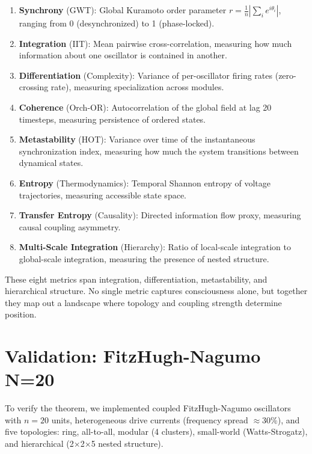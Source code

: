 \begin{enumerate}
  \item \textbf{Synchrony} (GWT): Global Kuramoto order parameter $r = \frac{1}{n}|\sum_i e^{i\theta_i}|$, ranging from 0 (desynchronized) to 1 (phase-locked).
  
  \item \textbf{Integration} (IIT): Mean pairwise cross-correlation, measuring how much information about one oscillator is contained in another.
  
  \item \textbf{Differentiation} (Complexity): Variance of per-oscillator firing rates (zero-crossing rate), measuring specialization across modules.
  
  \item \textbf{Coherence} (Orch-OR): Autocorrelation of the global field at lag 20 timesteps, measuring persistence of ordered states.
  
  \item \textbf{Metastability} (HOT): Variance over time of the instantaneous synchronization index, measuring how much the system transitions between dynamical states.
  
  \item \textbf{Entropy} (Thermodynamics): Temporal Shannon entropy of voltage trajectories, measuring accessible state space.
  
  \item \textbf{Transfer Entropy} (Causality): Directed information flow proxy, measuring causal coupling asymmetry.
  
  \item \textbf{Multi-Scale Integration} (Hierarchy): Ratio of local-scale integration to global-scale integration, measuring the presence of nested structure.
\end{enumerate}

These eight metrics span integration, differentiation, metastability, and hierarchical structure. No single metric captures consciousness alone, but together they map out a landscape where topology and coupling strength determine position.

\section{Validation: FitzHugh-Nagumo N=20}

To verify the theorem, we implemented coupled FitzHugh-Nagumo oscillators with $n = 20$ units, heterogeneous drive currents (frequency spread $\approx$30\%), and five topologies: ring, all-to-all, modular (4 clusters), small-world (Watts-Strogatz), and hierarchical (2$\times$2$\times$5 nested structure).

